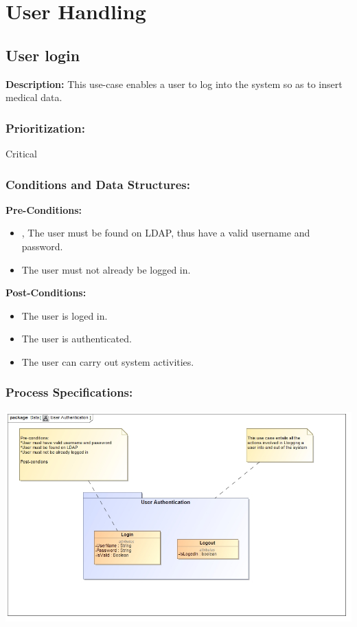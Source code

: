 

\section{User Handling}


\subsection{User login}
\textbf{Description:}
This use-case enables a user to log into the system so as to insert medical data.
\subsubsection{Prioritization:}
Critical
\subsubsection{Conditions and Data Structures:}
\textbf{Pre-Conditions:}
\begin{itemize}
	\item , The user must be found on LDAP, thus have a valid username and password.
	\item The user must not already be logged in.
\end{itemize}

\textbf{Post-Conditions:}	
\begin{itemize}
	\item The user is loged in.
	\item The user is authenticated.
	\item The user can carry out system activities.
\end{itemize}
\subsubsection{Process Specifications:} 
\includegraphics[width=1\linewidth]{./Graphics/Login}



